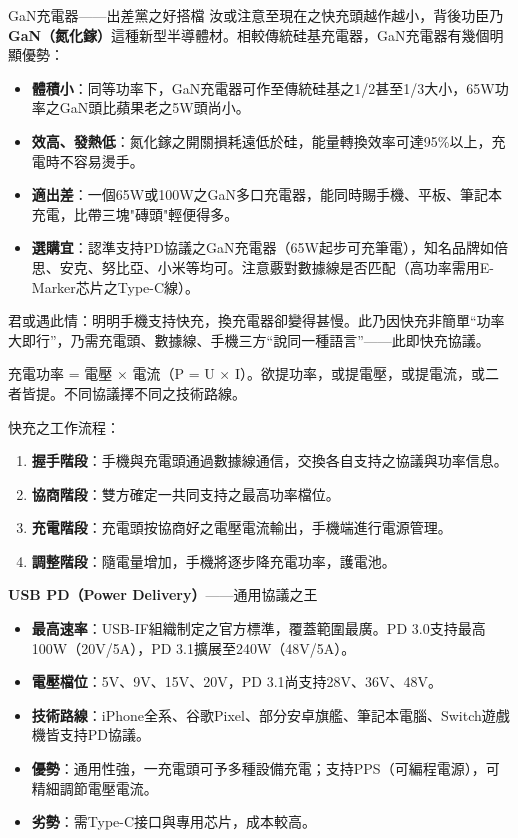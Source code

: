 \begin{tcbinfo}{GaN充電器——出差黨之好搭檔}
汝或注意至現在之快充頭越作越小，背後功臣乃\textbf{GaN（氮化鎵）}這種新型半導體材。相較傳統硅基充電器，GaN充電器有幾個明顯優勢：

\begin{itemize}
  \item \textbf{體積小}：同等功率下，GaN充電器可作至傳統硅基之1/2甚至1/3大小，65W功率之GaN頭比蘋果老之5W頭尚小。
  \item \textbf{效高、發熱低}：氮化鎵之開關損耗遠低於硅，能量轉換效率可達95\%以上，充電時不容易燙手。
  \item \textbf{適出差}：一個65W或100W之GaN多口充電器，能同時賜手機、平板、筆記本充電，比帶三塊"磚頭"輕便得多。
  \item \textbf{選購宜}：認準支持PD協議之GaN充電器（65W起步可充筆電），知名品牌如倍思、安克、努比亞、小米等均可。注意覈對數據線是否匹配（高功率需用E-Marker芯片之Type-C線）。
\end{itemize}

\end{tcbinfo}


君或遇此情：明明手機支持快充，換充電器卻變得甚慢。此乃因快充非簡單“功率大即行”，乃需充電頭、數據線、手機三方“說同一種語言”——此即快充協議。


充電功率 = 電壓 × 電流（P = U × I）。欲提功率，或提電壓，或提電流，或二者皆提。不同協議擇不同之技術路線。

快充之工作流程：

\begin{enumerate}
  \item \textbf{握手階段}：手機與充電頭通過數據線通信，交換各自支持之協議與功率信息。
  \item \textbf{協商階段}：雙方確定一共同支持之最高功率檔位。
  \item \textbf{充電階段}：充電頭按協商好之電壓電流輸出，手機端進行電源管理。
  \item \textbf{調整階段}：隨電量增加，手機將逐步降充電功率，護電池。
\end{enumerate}


\textbf{USB PD（Power Delivery）}——通用協議之王

\begin{itemize}
  \item \textbf{最高速率}：USB-IF組織制定之官方標準，覆蓋範圍最廣。PD 3.0支持最高100W（20V/5A），PD 3.1擴展至240W（48V/5A）。
  \item \textbf{電壓檔位}：5V、9V、15V、20V，PD 3.1尚支持28V、36V、48V。
  \item \textbf{技術路線}：iPhone全系、谷歌Pixel、部分安卓旗艦、筆記本電腦、Switch遊戲機皆支持PD協議。
  \item \textbf{優勢}：通用性強，一充電頭可予多種設備充電；支持PPS（可編程電源），可精細調節電壓電流。
  \item \textbf{劣勢}：需Type-C接口與專用芯片，成本較高。
\end{itemize}

